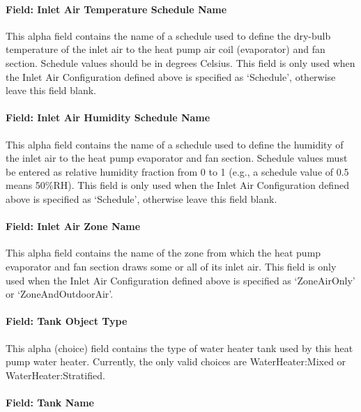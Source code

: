 \paragraph{Field: Inlet Air Temperature Schedule Name}\label{field-inlet-air-temperature-schedule-name}

This alpha field contains the name of a schedule used to define the dry-bulb temperature of the inlet air to the heat pump air coil (evaporator) and fan section. Schedule values should be in degrees Celsius. This field is only used when the Inlet Air Configuration defined above is specified as `Schedule', otherwise leave this field blank.

\paragraph{Field: Inlet Air Humidity Schedule Name}\label{field-inlet-air-humidity-schedule-name}

This alpha field contains the name of a schedule used to define the humidity of the inlet air to the heat pump evaporator and fan section. Schedule values must be entered as relative humidity fraction from 0 to 1 (e.g., a schedule value of 0.5 means 50\%RH). This field is only used when the Inlet Air Configuration defined above is specified as `Schedule', otherwise leave this field blank.

\paragraph{Field: Inlet Air Zone Name}\label{field-inlet-air-zone-name}

This alpha field contains the name of the zone from which the heat pump evaporator and fan section draws some or all of its inlet air. This field is only used when the Inlet Air Configuration defined above is specified as `ZoneAirOnly' or `ZoneAndOutdoorAir'.

\paragraph{Field: Tank Object Type}\label{field-tank-object-type-000}

This alpha (choice) field contains the type of water heater tank used by this heat pump water heater. Currently, the only valid choices are WaterHeater:Mixed or WaterHeater:Stratified.

\paragraph{Field: Tank Name}\label{field-tank-name-000}

